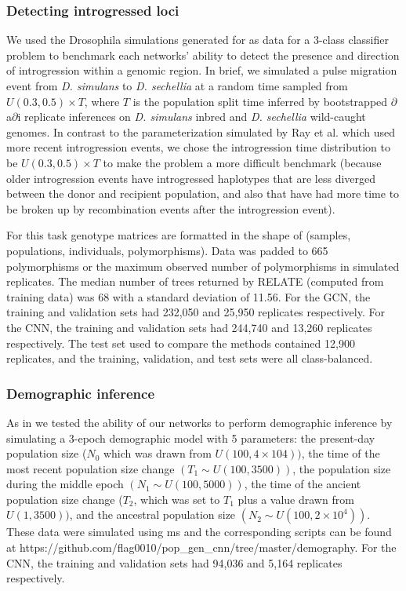 \subsubsection{Detecting introgressed loci}

We used the Drosophila simulations generated for \cite{rayIntroUNETIdentifyingIntrogressed2023} as data for a 3-class classifier problem to benchmark each networks' ability to detect the presence and direction of introgression within a genomic region. In brief, we simulated a pulse migration event from \textit{D. simulans} to \textit{D. sechellia} at a random time sampled from $U(0.3, 0.5) \times T$, where $T$ is the population split time inferred by bootstrapped $\partial$a$\partial$i \cite{gutenkunstDiffusionApproximationsDemographic2010} replicate inferences on \textit{D. simulans} inbred and \textit{D. sechellia} wild-caught genomes. In contrast to the parameterization simulated by Ray et al. \cite{rayIntroUNETIdentifyingIntrogressed2023} which used more recent introgression events, we chose the introgression time distribution to be $U(0.3, 0.5) \times T$ to make the problem a more difficult benchmark (because older introgression events have introgressed haplotypes that are less diverged between the donor and recipient population, and also that have had more time to be broken up by recombination events after the introgression event).

For this task genotype matrices are formatted in the shape of (samples, populations, individuals, polymorphisms). Data was padded to 665 polymorphisms or the maximum observed number of polymorphisms in simulated replicates. The median number of trees returned by RELATE (computed from training data) was 68 with a standard deviation of 11.56. For the GCN, the training and validation sets had 232,050 and 25,950 replicates respectively. For the CNN, the training and validation sets had 244,740 and 13,260 replicates respectively. The test set used to compare the methods contained 12,900 replicates, and the training, validation, and test sets were all class-balanced.

\subsubsection{Demographic inference}

As in \cite{flagelUnreasonableEffectivenessConvolutional2019} we tested the ability of our networks to perform demographic inference by simulating a 3-epoch demographic model with 5 parameters: the present-day population size ($N_0$ which was drawn from $U(100, 4 \times 104))$, the time of the most recent population size change $(T_1 \sim U(100, 3500))$, the population size during the middle epoch $(N_1 \sim U(100, 5000))$, the time of the ancient population size change ($T_2$, which was set to $T_1$ plus a value drawn from $U(1, 3500))$, and the ancestral population size $(N_2 \sim U(100, 2 \times 10^4))$. These data were simulated using ms and the corresponding scripts can be found at https://github.com/flag0010/pop\_gen\_cnn/tree/master/demography. For the CNN, the training and validation sets had 94,036 and 5,164 replicates respectively.

